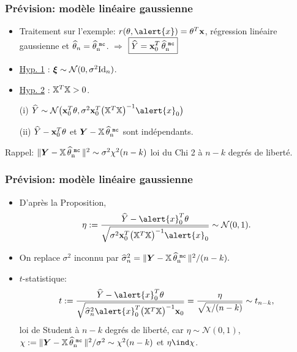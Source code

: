 \begin{frame}
\frametitle{Prévision: modèle linéaire gaussienne}
\begin{itemize}
\item Traitement sur l'exemple: $r(\truetheta, \alert{x})=\truetheta^T{\bf
x}$, régression \alert{linéaire gaussienne} et
$\operatorname{\widehat \theta_{\mathnormal{n}}}=\operatorname{\widehat \theta_n^{\,\,{\tt mc}}}$. $\Longrightarrow$ $\boxed{\widehat Y = {\bf
x}_0^T\operatorname{\widehat \theta_n^{\,\,{\tt mc}}}}$
\item \underline{Hyp. 1} : $\boldsymbol{\xi} \sim {\mathcal N}(0,\sigma^2\mathrm{Id}_n)$.
\item \underline{Hyp. 2} : $\mathbb{X}^T \mathbb{X}>0$.
\end{itemize}
\begin{prop}
\begin{itemize}
\item[(i)] $\widehat Y \sim {\mathcal N}\big({\bf
x}_0^T\truetheta, \sigma^2 {\bf
x}_0^T\big(\regressmat^T\regressmat\big)^{-1}\alert{x}_0\big)$
\item[(ii)] $\widehat Y-{\bf
x}_0^T\theta$ et $\boldsymbol{Y}-\mathbb{X} \operatorname{\widehat \theta_n^{\,\,{\tt mc}}}$ sont
indépendants.
\end{itemize}
\end{prop}
Rappel: $\|\boldsymbol{Y}-\mathbb{X} \operatorname{\widehat \theta_n^{\,\,{\tt mc}}}\|^2 \sim
\sigma^2\chi^2(n-k)$ \alert{ loi du Chi 2 à $n-k$ degrés de
liberté}.
\end{frame}

\begin{frame}
\frametitle{Prévision: modèle linéaire gaussienne}
\begin{itemize}
\item D'après la Proposition,
$$
\eta:=\frac{\widehat Y -\alert{x}_0^T\truetheta} {\sqrt{\sigma^2 {\bf
x}_0^T\big(\regressmat^T\regressmat\big)^{-1}\alert{x}_0}}\sim {\mathcal
N}(0,1).
$$
\item On replace $\sigma^2$ inconnu par $\widehat \sigma_n^2 =
{\|\boldsymbol{Y}-\mathbb{X} \operatorname{\widehat \theta_n^{\,\,{\tt mc}}}\|^2}/({n-k}).$
\item \alert{$t$-statistique:}
$$
t:= \frac{\widehat Y -\alert{x}_0^T\truetheta} {\sqrt{\widehat
\sigma_n^2 \alert{x}_0^T\big(\regressmat^T\regressmat\big)^{-1}{\bf
x}_0}}=\frac{\eta}{\sqrt{\chi/(n-k)}}\sim t_{n-k},
$$
\alert{loi de Student à $n-k$ degrés de liberté}, car $\eta\sim
{\mathcal N}(0,1)$, $\chi:=\|\boldsymbol{Y}-\mathbb{X}
\operatorname{\widehat \theta_n^{\,\,{\tt mc}}}\|^2/\sigma^2\sim \chi^2(n-k)$ et $\eta\ind\chi$.
\end{itemize}
\end{frame}

